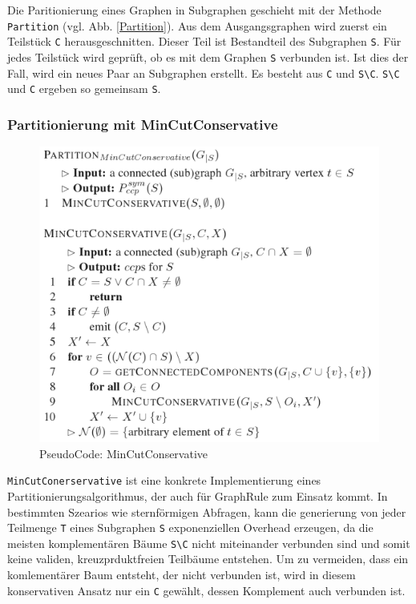 Die Paritionierung eines Graphen in Subgraphen geschieht mit der Methode \texttt{Partition} (vgl. Abb. \ref{Partition}). Aus dem Ausgangsgraphen wird zuerst ein Teilstück \texttt{C} herausgeschnitten. Dieser Teil ist Bestandteil des Subgraphen \texttt{S}. Für jedes Teilstück wird geprüft, ob es mit dem Graphen \texttt{S} verbunden ist. Ist dies der Fall, wird ein neues Paar an Subgraphen erstellt. Es besteht aus \texttt{C} und  \texttt{S\textbackslash C}. \texttt{S\textbackslash C} und \texttt{C} ergeben so gemeinsam \texttt{S}.


\subsubsection{Partitionierung mit MinCutConservative}

\begin{figure}[ht]
  \centering
  \includegraphics[scale=0.5]{03_Regeln/00_media/MinCutConservative.png}
  \caption{PseudoCode: MinCutConservative}
  \label{MinCutConservative}
\end{figure}

\texttt{MinCutConerservative} ist eine konkrete Implementierung eines Partitionierungsalgorithmus, der auch für GraphRule zum Einsatz kommt. In bestimmten Szearios wie sternförmigen Abfragen, kann die generierung von jeder Teilmenge \texttt{T} eines Subgraphen \texttt{S} exponenziellen Overhead erzeugen, da die meisten komplementären Bäume \texttt{S\textbackslash C} nicht miteinander verbunden sind und somit keine validen, kreuzprduktfreien Teilbäume entstehen. Um zu vermeiden, dass ein komlementärer Baum entsteht, der nicht verbunden ist, wird in diesem konservativen Ansatz nur ein \texttt{C} gewählt, dessen Komplement auch verbunden ist. 







